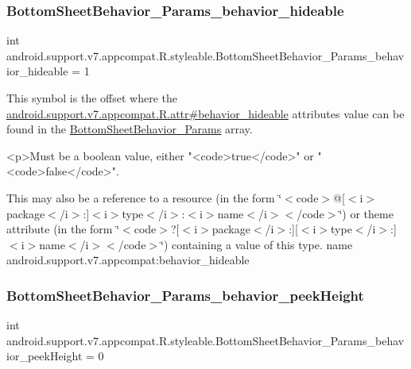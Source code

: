 \subsubsection{\texorpdfstring{Bottom\+Sheet\+Behavior\+\_\+\+Params\+\_\+behavior\+\_\+hideable}{BottomSheetBehavior\_Params\_behavior\_hideable}}
{\footnotesize\ttfamily int android.\+support.\+v7.\+appcompat.\+R.\+styleable.\+Bottom\+Sheet\+Behavior\+\_\+\+Params\+\_\+behavior\+\_\+hideable = 1\hspace{0.3cm}{\ttfamily [static]}}

This symbol is the offset where the \hyperlink{classandroid_1_1support_1_1v7_1_1appcompat_1_1R_1_1attr_a87f1263041e8659e9a13195dc36cca7f}{android.\+support.\+v7.\+appcompat.\+R.\+attr\#behavior\+\_\+hideable} attribute\textquotesingle{}s value can be found in the \hyperlink{classandroid_1_1support_1_1v7_1_1appcompat_1_1R_1_1styleable_aed00e7319fe5debc6a1621afa2ca6bb5}{Bottom\+Sheet\+Behavior\+\_\+\+Params} array.

\begin{DoxyVerb}      <p>Must be a boolean value, either "<code>true</code>" or "<code>false</code>".
\end{DoxyVerb}
 

This may also be a reference to a resource (in the form \char`\"{}$<$code$>$@\mbox{[}$<$i$>$package$<$/i$>$\+:\mbox{]}$<$i$>$type$<$/i$>$\+:$<$i$>$name$<$/i$>$$<$/code$>$\char`\"{}) or theme attribute (in the form \char`\"{}$<$code$>$?\mbox{[}$<$i$>$package$<$/i$>$\+:\mbox{]}\mbox{[}$<$i$>$type$<$/i$>$\+:\mbox{]}$<$i$>$name$<$/i$>$$<$/code$>$\char`\"{}) containing a value of this type.  name android.\+support.\+v7.\+appcompat\+:behavior\+\_\+hideable \mbox{\label{classandroid_1_1support_1_1v7_1_1appcompat_1_1R_1_1styleable_a6da8e778122e08e2149ff3d5f02d8f79}} 
\subsubsection{\texorpdfstring{Bottom\+Sheet\+Behavior\+\_\+\+Params\+\_\+behavior\+\_\+peek\+Height}{BottomSheetBehavior\_Params\_behavior\_peekHeight}}
{\footnotesize\ttfamily int android.\+support.\+v7.\+appcompat.\+R.\+styleable.\+Bottom\+Sheet\+Behavior\+\_\+\+Params\+\_\+behavior\+\_\+peek\+Height = 0\hspace{0.3cm}{\ttfamily [static]}}

